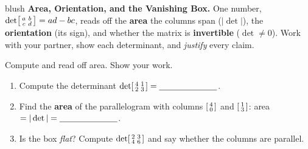 \documentclass[10pt]{article}
\begin{document}
\namepartnerperiod

\vspace{0.10in}

\begin{headlinebox}{blush}
\small\textbf{Area, Orientation, and the Vanishing Box.} One number, $\det\begin{bsmallmatrix} a & b\\ c & d \end{bsmallmatrix}=ad-bc$,
reads off the \textbf{area} the columns span ($|\det|$), the \textbf{orientation} (its sign), and
whether the matrix is \textbf{invertible} ($\det\ne0$). Work with your partner, show each
determinant, and \emph{justify} every claim.
\end{headlinebox}

\vspace{0.10in}

\begin{tcolorbox}[colback=white, colframe=black!40, title=\textbf{Tier R --- Remediate},
    fonttitle=\bfseries, arc=1.5mm, left=3mm, right=3mm, top=2mm, bottom=2mm, breakable]
Compute and read off area. Show your work.
\begin{enumerate}[leftmargin=1.7em, itemsep=8pt]
  \item Compute the determinant
        $\det\begin{bsmallmatrix} 4 & 1\\ 2 & 3 \end{bsmallmatrix} = \blank{2.4cm}$.
  \item Find the \textbf{area} of the parallelogram with columns
        $\begin{bsmallmatrix} 4\\0 \end{bsmallmatrix}$ and $\begin{bsmallmatrix} 1\\3 \end{bsmallmatrix}$:
        \quad area $=|\det| = \blank{2.4cm}$.
  \item Is the box \emph{flat}? Compute $\det\begin{bsmallmatrix} 2 & 3\\ 4 & 6 \end{bsmallmatrix}$ and
        say whether the columns are parallel. \; \blank{3.0cm}
\end{enumerate}
\end{tcolorbox}
\end{document}
